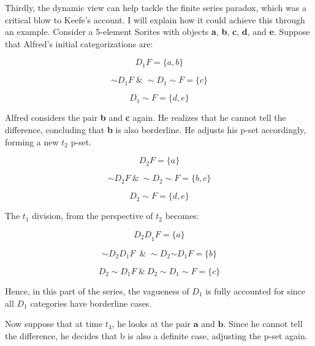 Thirdly, the dynamic view can help tackle the finite series paradox,
which was a critical blow to Keefe's account. I will explain how it
could achieve this through an example. Consider a 5-element Sorites with
objects \textbf{a}, \textbf{b}, \textbf{c}, \textbf{d}, and \textbf{e}.
Suppose that Alfred's initial categorizations are:

\[D_{1}F = \{ a,b\}\]

\[{\sim}D_{1}F\; \& \; {\sim}D_{1}{\sim}F = \{ c\}\]

\[D_{1}{\sim}F = \{ d,e\}\]

Alfred considers the pair \textbf{b} and \textbf{c} again. He realizes
that he cannot tell the difference, concluding that \textbf{b} is also
borderline. He adjusts his p-set accordingly, forming a new \(t_{2}\)
p-set.

\[D_{2}F = \{ a\}\]

\[{\sim}D_{2}F\ \&\ {\sim}D_{2}{\sim}F = \{ b,c\}\]

\[D_{2}{\sim}F = \{ d,e\}\]

\begin{center}
  \end{center}
 
The \(t_{1}\) division, from the perspective of \(t_{2}\) becomes:

\emph{\hfill\break
}\[{D_{2}D}_{1}F = \{ a\}\]

\[{\sim}D_{2}D_{1}F\ \; \& \; {\sim}D_{2}{{\sim}D}_{1}F = \{ b\}\]

\[D_{2}{\sim}D_{1}F\ \&\ D_{2}{\sim}D_{1}{\sim}F = \{ c\}\]

\begin{center}
  \end{center}
Hence, in this part of the series, the vagueness of \(D_{1}\) is fully
accounted for since all \(D_{1}\) categories have borderline cases.

Now suppose that at time \(t_{3}\), he looks at the pair $\mathbf{a}$ and
$\mathbf{b}$. Since he cannot tell the difference, he decides that b is
also a definite case, adjusting the p-set again.

